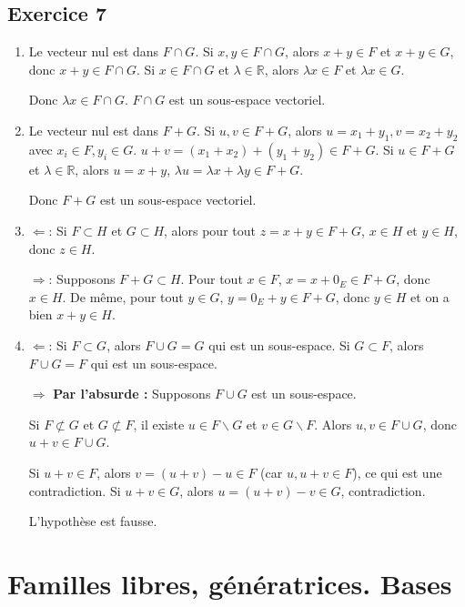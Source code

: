\documentclass[french]{yLectureNote}
\begin{document}
\subsection{Exercice 7}
\begin{enumerate}
    \item Le vecteur nul est dans $F\cap G$. Si $x,y\in F\cap G$, alors $x+y\in F$ et $x+y\in G$, donc $x+y\in F\cap G$. Si $x\in F\cap G$ et $\lambda\in\mathbb{R}$, alors $\lambda x\in F$ et $\lambda x\in G$.

    Donc $\lambda x\in F\cap G$. $F\cap G$ est un sous-espace vectoriel.

    \item Le vecteur nul est dans $F+G$. Si $u,v\in F+G$, alors $u=x_1+y_1, v=x_2+y_2$ avec $x_i\in F, y_i\in G$. $u+v=(x_1+x_2)+(y_1+y_2)\in F+G$. Si $u\in F+G$ et $\lambda\in\mathbb{R}$, alors $u=x+y$, $\lambda u=\lambda x+\lambda y\in F+G$.

    Donc $F+G$ est un sous-espace vectoriel.

    \item $\Leftarrow$: Si $F\subset H$ et $G\subset H$, alors pour tout $z=x+y\in F+G$, $x\in H$ et $y\in H$, donc $z\in H$.

    $\Rightarrow$: Supposons $F+G\subset H$. Pour tout $x\in F$, $x=x+0_E\in F+G$, donc $x\in H$. De même, pour tout $y\in G$, $y=0_E+y\in F+G$, donc $y\in H$ et on a bien \(x+y\in H\).


    \item $\Leftarrow$: Si $F\subset G$, alors $F\cup G=G$ qui est un sous-espace. Si $G\subset F$, alors $F\cup G=F$ qui est un sous-espace.

    $\Rightarrow$ \textbf{Par l'absurde :} Supposons $F\cup G$ est un sous-espace.

    Si $F\not\subset G$ et $G\not\subset F$, il existe $u\in F\backslash G$ et $v\in G\backslash F$. Alors $u,v\in F\cup G$, donc $u+v\in F\cup G$.

    Si $u+v\in F$, alors $v=(u+v)-u\in F$ (car $u, u+v\in F$), ce qui est une contradiction. Si $u+v\in G$, alors $u=(u+v)-v\in G$, contradiction.

    L'hypothèse est fausse.
\end{enumerate}

\section{Familles libres, génératrices. Bases}
\end{document}
